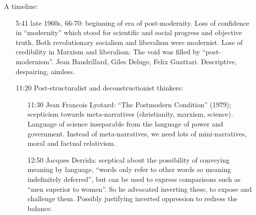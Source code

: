 \documentclass[10pt,titlepage]{book}
\begin{document}
A timeline:
\begin{itemize}
\item[5:41] late 1960s, 66-70: beginning of era of post-modernity.
  Loss of confidence in ``modernity'' which stood for scientific and social progress and objective truth.
  Both revolutionary socialism and liberalism were modernist.
  Loss of credibility in Marxism and liberalism.
  The void was filled by ``post-modernism''.
   Jean Baudrillard, Giles Deluge, Felix Guattari.
   Descriptive, despairing, aimless.
 \item[11:20]Post-structuralist and deconstructionist thinkers:

   \begin{itemize}

   \item[11:30] Jean Francois Lyotard: ``The Postmodern Condition'' (1979); scepticism towards meta-narratives (christianity, marxism, science).
     Language of science inseparable from the language of power and government.
     Instead of meta-narratives, we need lots of mini-narratives, moral and factual relativism.

   \item[12:50] Jacques Derrida: sceptical about the possibility of conveying meaning by language, ``words only refer to other words so meaning indefinitely deferred'', but can be used to express comparisons such as ``men superior to women''.  So he advocated inverting these, to expose and challenge them.  Possibly justifying inverted oppression to redress the balance.


\end{itemize}
\end{itemize}
\end{document}
